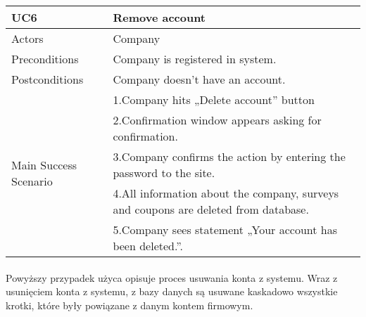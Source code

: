 	\begin{table}[H]
	\centering
	\sffamily\captionsetup{justification=raggedright,singlelinecheck=false,position = below, font = sf}
	\begin{tabular}{|m{3.5cm}|m{11cm}|}
	\hline 
	UC6 & Remove account \\
	\hline
	Actors & Company \\
	\hline
	Preconditions & Company is registered in system. \\
	\hline
	Postconditions & Company doesn’t have an account. \\	
	\hline
	\multirow{5}{*}{Main Success Scenario} & 1.Company hits „Delete account” button \\
	\cline{2-2}
	& 2.Confirmation window appears asking for confirmation. \\
	\cline{2-2}
	& 3.Company confirms the action by entering the password to the site. \\
	\cline{2-2}
	& 4.All information about the company, surveys and coupons are deleted from database. \\
	\cline{2-2}
	& 5.Company sees statement „Your account has been deleted.”. \\
	\hline
	\end{tabular}
\end{table}

\paragraph{}
Powyższy przypadek użyca opisuje proces usuwania konta z systemu. Wraz z usunięciem konta z systemu, z bazy danych są usuwane kaskadowo wszystkie krotki, które były powiązane z danym kontem firmowym.


